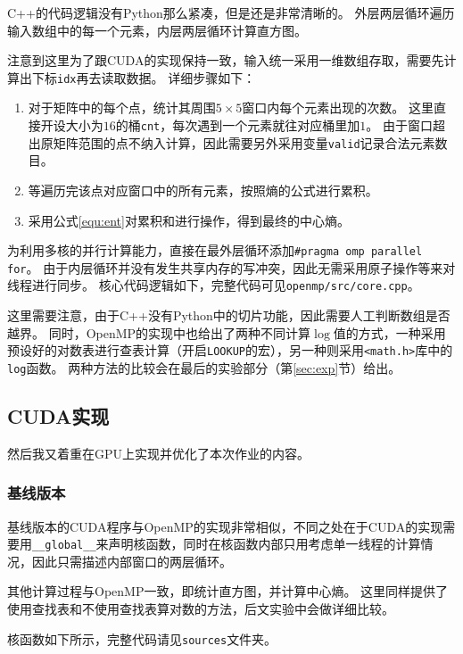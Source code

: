\documentclass[logo,reportComp]{thesis}
\begin{document}
C++的代码逻辑没有Python那么紧凑，但是还是非常清晰的。
外层两层循环遍历输入数组中的每一个元素，内层两层循环计算直方图。

注意到这里为了跟CUDA的实现保持一致，输入统一采用一维数组存取，需要先计算出下标\verb'idx'再去读取数据。
详细步骤如下：
\begin{enumerate}
\item 对于矩阵中的每个点，统计其周围$5\times 5$窗口内每个元素出现的次数。
这里直接开设大小为$16$的桶\verb'cnt'，每次遇到一个元素就往对应桶里加$1$。
由于窗口超出原矩阵范围的点不纳入计算，因此需要另外采用变量\verb'valid'记录合法元素数目。
\item 等遍历完该点对应窗口中的所有元素，按照熵的公式进行累积。
\item 采用公式\ref{equ:ent}对累积和进行操作，得到最终的中心熵。
\end{enumerate}

为利用多核的并行计算能力，直接在最外层循环添加\verb'#pragma omp parallel for'。
由于内层循环并没有发生共享内存的写冲突，因此无需采用原子操作等来对线程进行同步。
核心代码逻辑如下，完整代码可见\verb'openmp/src/core.cpp'。



这里需要注意，由于C++没有Python中的切片功能，因此需要人工判断数组是否越界。
同时，OpenMP的实现中也给出了两种不同计算$\log$值的方式，一种采用预设好的对数表进行查表计算（开启\verb'LOOKUP'的宏），另一种则采用\verb'<math.h>'库中的\verb'log'函数。
两种方法的比较会在最后的实验部分（第\ref{sec:exp}节）给出。

\subsection{CUDA实现}
然后我又着重在GPU上实现并优化了本次作业的内容。

\subsubsection{基线版本}
基线版本的CUDA程序与OpenMP的实现非常相似，不同之处在于CUDA的实现需要用\verb'__global__'来声明核函数，同时在核函数内部只用考虑单一线程的计算情况，因此只需描述内部窗口的两层循环。

其他计算过程与OpenMP一致，即统计直方图，并计算中心熵。
这里同样提供了使用查找表和不使用查找表算对数的方法，后文实验中会做详细比较。

核函数如下所示，完整代码请见\verb'sources'文件夹。

\end{document}
